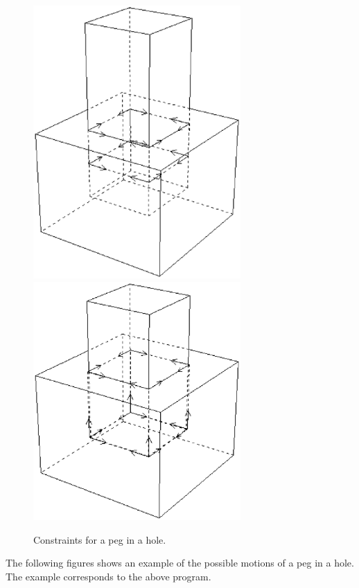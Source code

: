 \begin{figure}[h]
\includegraphics[width=7.9cm]{fig/fig-peg-in-hole3.ps}
\includegraphics[width=7.9cm]{fig/fig-peg-in-hole4.ps}
\caption{Constraints for a peg in a hole.}
\label{fig:peg-in-hole}
\end{figure}

\clearpage

The following figures shows an example of the possible motions
of a peg in a hole.
The example corresponds to the above program.\\

